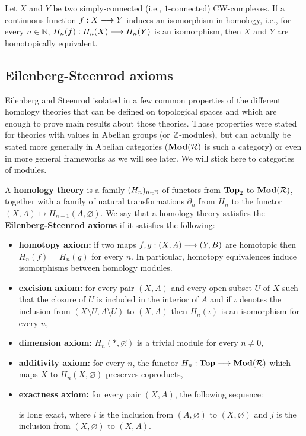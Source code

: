 \begin{theo} Let $X$ and $Y$ be two simply-connected (i.e., $1$-connected) CW-complexes. If a continuous function $f : X \longrightarrow Y$ induces an isomorphism in homology, i.e., for every $n\in \mathbb{N}$, $H_n(f) : H_n(X) \longrightarrow H_n(Y)$ is an isomorphism, then $X$ and $Y$ are homotopically equivalent.
\end{theo}

\subsection{Eilenberg-Steenrod axioms}
\label{subsec:eilste}

Eilenberg and Steenrod isolated in \cite{eilenberg45} a few common properties of the different homology theories that can be defined on topological spaces and which are enough to prove main results about those theories. Those properties were stated for theories with values in Abelian groups (or $\mathbb{Z}$-modules), but can actually be stated more generally in Abelian categories ($\textbf{Mod}(\mathcal{R})$ is such a category) or even in more general frameworks as we will see later. We will stick here to categories of modules. 

A \textbf{homology theory} is a family $(H_n)_{n\in \mathbb{N}}$ of functors from $\textbf{Top}_2$ to $\textbf{Mod}(\mathcal{R})$, together with a family of natural transformations $\partial_n$ from $H_n$ to the functor $(X,A) \mapsto H_{n-1}(A,\varnothing)$. We say that a homology theory satisfies the \textbf{Eilenberg-Steenrod axioms} if it satisfies the following:
\begin{itemize}
	\item \textbf{homotopy axiom:} if two maps $f,g : (X,A) \longrightarrow (Y,B)$ are homotopic then $H_n(f) = H_n(g)$ for every $n$. In particular, homotopy equivalences induce isomorphisms between homology modules.
	\item \textbf{excision axiom:} for every pair $(X,A)$ and every open subset $U$ of $X$ such that the closure of $U$ is included in the interior of $A$ and if $\iota$ denotes the inclusion from $(X\setminus U,A\setminus U)$ to $(X,A)$ then $H_n(\iota)$ is an isomorphism for every $n$,
	\item \textbf{dimension axiom:} $H_n(\ast,\varnothing)$ is a trivial module for every $n \neq 0$,
	\item \textbf{additivity axiom:} for every $n$, the functor $H_n : \textbf{Top} \longrightarrow \textbf{Mod}(\mathcal{R})$ which maps $X$ to $H_n(X,\varnothing)$ preserves coproducts,
	\item \textbf{exactness axiom:} for every pair $(X,A)$, the following sequence:
	\begin{figure}[H]
		\begin{center}
    			
  		\end{center}
	\end{figure}
	\vskip -0.5cm
	is long exact, where $i$ is the inclusion from $(A,\varnothing)$ to $(X,\varnothing)$ and $j$ is the inclusion from $(X,\varnothing)$ to $(X,A)$.
\end{itemize}

